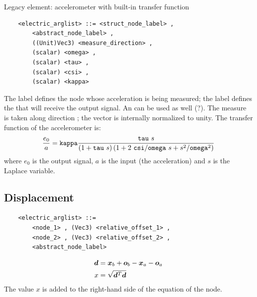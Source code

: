 \noindent
Legacy element: accelerometer with built-in transfer function
\begin{verbatim}
    <electric_arglist> ::= <struct_node_label> ,
        <abstract_node_label> ,
        ((Unit)Vec3) <measure_direction> ,
        (scalar) <omega> ,
        (scalar) <tau> ,
        (scalar) <csi> ,
        (scalar) <kappa>	
\end{verbatim}
The label  defines the node whose acceleration 
is being measured; the label  defines the
 that will receive the output signal. 
An  can be used as well (?).
The measure is taken along direction ;
the vector is internally normalized to unity.
The transfer function of the accelerometer is:
\begin{displaymath}
    \frac{e_0}{a} = \texttt{kappa}\frac{\texttt{tau} \ s}{
        \left( 1+\texttt{tau} \ s \right)
        \left( 1+2 \ \texttt{csi}/\texttt{omega} \ s+s^2/\texttt{omega}^2 \right)
    }
\end{displaymath}
where $ e_0 $ is the output signal, $ a $ is the input (the acceleration)
and $ s $ is the Laplace variable.

\subsection{Displacement}
\begin{verbatim}
    <electric_arglist> ::=
        <node_1> , (Vec3) <relative_offset_1> ,
        <node_2> , (Vec3) <relative_offset_2> ,
        <abstract_node_label>
\end{verbatim}
\begin{subequations}
\begin{align}
	\boldsymbol{d} &= \boldsymbol{x}_b + \boldsymbol{o}_b - \boldsymbol{x}_a - \boldsymbol{o}_a \\
	x &= \sqrt{\boldsymbol{d}^T \boldsymbol{d}}
\end{align}
\end{subequations}
The value $x$ is added to the right-hand side of the equation
of the  node.

